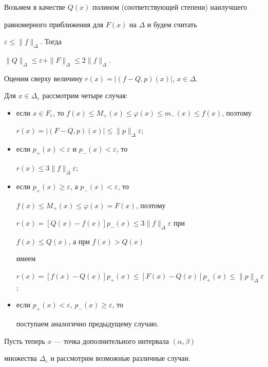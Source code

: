 Возьмем в качестве $Q(x)$ полином (соответствующей степени) наилучшего


равномерного приближения для $F(x)$ на $\Delta$ и будем считать


$\varepsilon\le\|f\|_\Delta$. Тогда


$\|Q\|_\Delta\le\varepsilon+\|F\|_\Delta\le 2\|f\|_\Delta$.





Оценим сверху величину $r(x)=|(f-Q,p)(x)|$, $x\in\Delta$.





Для $x\in\Delta_\varepsilon$ рассмотрим четыре случая:


\begin{itemize}


\item[1)] если $x\in F_\varepsilon$, то $f(x)\le M_+(x)\le\varphi(x)\le


m_-(x)\le f(x)$, поэтому


$r(x)=|(F-Q,p)(x)|\le\|p\|_\Delta\varepsilon$;


\item[2)] если $p_+(x)<\varepsilon$ и $p_-(x)<\varepsilon$, то


$r(x)\le 3\|f\|_\Delta\varepsilon$;


\item[3)] если $p_+(x)\ge\varepsilon$, а $p_-(x)<\varepsilon$, то


$f(x)\le M_+(x)\le\varphi(x)=F(x)$, поэтому


$r(x)=[Q(x)-f(x)]p_-(x)\le 3\|f\|_\Delta\varepsilon$ при


$f(x)\le Q(x)$, а при $f(x)>Q(x)$


имеем


$r(x)=[f(x)-Q(x)]p_+(x)\le[F(x)-Q(x)]p_+(x)


\le\|p\|_\Delta\varepsilon$;


\item[4)] если $p_+(x)<\varepsilon$, $p_-(x)\ge\varepsilon$, то


поступаем аналогично предыдущему случаю.


\end{itemize}





Пусть теперь $x$ --- точка дополнительного интервала $(\alpha,\beta)$


множества $\Delta_\varepsilon$ и рассмотрим возможные различные случаи.





